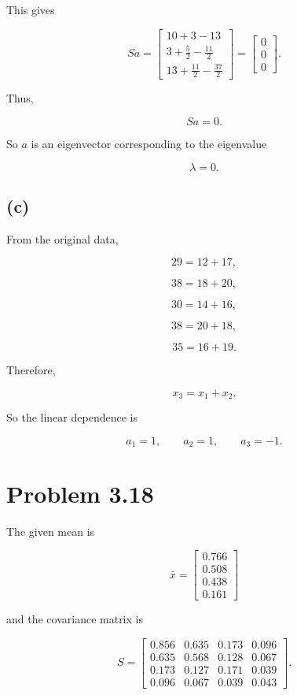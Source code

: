 \documentclass[12pt]{article}
\begin{document}
This gives

$$
Sa=
\begin{bmatrix}
10+3-13\\
3+\frac52-\frac{11}{2}\\
13+\frac{11}{2}-\frac{37}{2}
\end{bmatrix}
=
\begin{bmatrix}
0\\0\\0
\end{bmatrix}.
$$

Thus,

$$
\boxed{Sa=0}.
$$

So $a$ is an eigenvector corresponding to the eigenvalue

$$
\boxed{\lambda=0}.
$$

\subsection*{(c)}

From the original data,

$$
29=12+17,
$$

$$
38=18+20,
$$

$$
30=14+16,
$$

$$
38=20+18,
$$

$$
35=16+19.
$$

Therefore,

$$
\boxed{x_3=x_1+x_2}.
$$

So the linear dependence is

$$
\boxed{a_1=1,\qquad a_2=1,\qquad a_3=-1}.
$$

\newpage

\section*{Problem 3.18}

The given mean is

$$
\bar{x}=
\begin{bmatrix}
0.766\\
0.508\\
0.438\\
0.161
\end{bmatrix}
$$

and the covariance matrix is

$$
S=
\begin{bmatrix}
0.856&0.635&0.173&0.096\\
0.635&0.568&0.128&0.067\\
0.173&0.127&0.171&0.039\\
0.096&0.067&0.039&0.043
\end{bmatrix}.
$$
\end{document}
